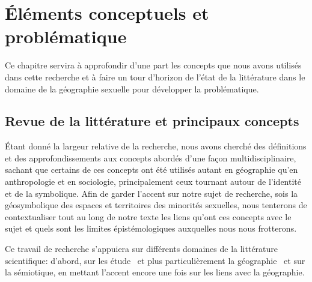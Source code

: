\chapter{Éléments conceptuels et problématique}
\label{cha:elements_conceptuels_et_problematique}


Ce chapitre servira à approfondir d'une part les concepts que nous avons utilisés dans cette recherche et à faire un tour d'horizon de l'état de la littérature dans le domaine de la géographie sexuelle pour développer la problématique.

\section{Revue de la littérature et principaux concepts}
\label{sec:revue_de_la_litterature_et_principaux_concepts} 

Étant donné la largeur relative de la recherche, nous avons cherché des définitions et des approfondissements aux concepts abordés d'une façon multidisciplinaire, sachant que certains de ces concepts ont été utilisés autant en géographie qu'en anthropologie et en sociologie, principalement ceux tournant autour de l'identité et de la symbolique. 
Afin de garder l’accent sur notre sujet de recherche, sois la géosymbolique des espaces et territoires des minorités sexuelles, nous tenterons de contextualiser tout au long de notre texte les liens qu'ont ces concepts avec le sujet et quels sont les limites épistémologiques auxquelles nous nous frotterons. 

Ce travail de recherche s’appuiera sur différents domaines de la littérature scientifique: d'abord, sur les étude \qus\ et plus particulièrement la géographie \qu\ et sur la sémiotique, en mettant l'accent encore une fois sur les liens avec la géographie. 


